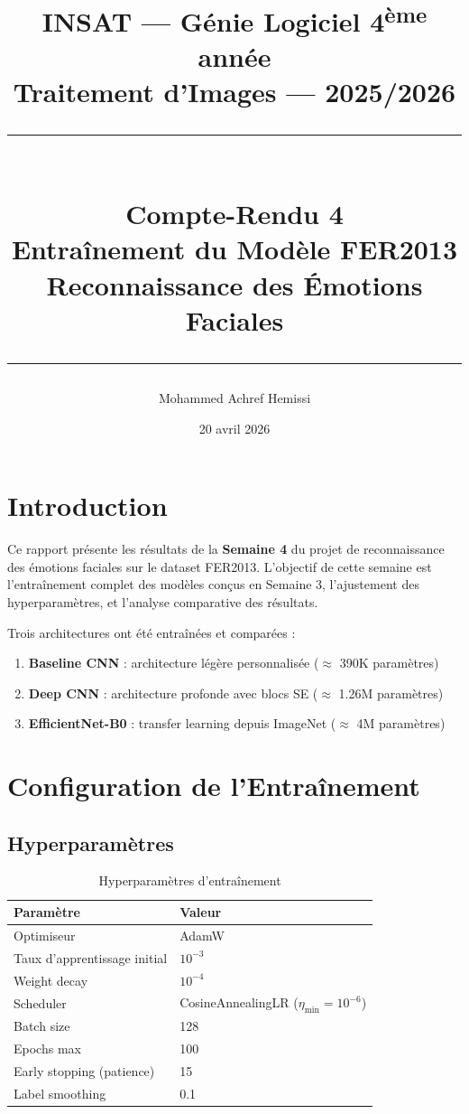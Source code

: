 \documentclass[12pt,a4paper]{article}
\title{
    \vspace{-1cm}
    {\large \textbf{INSAT --- Génie Logiciel 4\textsuperscript{ème} année}}\\[0.3cm]
    {\large Traitement d'Images --- 2025/2026}\\[0.5cm]
    \rule{\linewidth}{0.5pt}\\[0.4cm]
    {\LARGE \textbf{Compte-Rendu 4}}\\[0.2cm]
    {\Large Entraînement du Modèle FER2013}\\[0.2cm]
    {\large Reconnaissance des Émotions Faciales}\\[0.3cm]
    \rule{\linewidth}{0.5pt}
}
\author{Mohammed Achref Hemissi}
\date{20 avril 2026}
\begin{document}
\maketitle
\thispagestyle{empty}
\tableofcontents
\newpage

\section{Introduction}

Ce rapport présente les résultats de la \textbf{Semaine 4} du projet de reconnaissance des émotions faciales sur le dataset FER2013. L'objectif de cette semaine est l'entraînement complet des modèles conçus en Semaine 3, l'ajustement des hyperparamètres, et l'analyse comparative des résultats.

Trois architectures ont été entraînées et comparées :
\begin{enumerate}
    \item \textbf{Baseline CNN} : architecture légère personnalisée ($\approx$ 390K paramètres)
    \item \textbf{Deep CNN} : architecture profonde avec blocs SE ($\approx$ 1.26M paramètres)
    \item \textbf{EfficientNet-B0} : transfer learning depuis ImageNet ($\approx$ 4M paramètres)
\end{enumerate}

\section{Configuration de l'Entraînement}

\subsection{Hyperparamètres}

\begin{table}[H]
\centering
\caption{Hyperparamètres d'entraînement}
\begin{tabular}{ll}
\toprule
\textbf{Paramètre} & \textbf{Valeur} \\
\midrule
Optimiseur          & AdamW \\
Taux d'apprentissage initial & $10^{-3}$ \\
Weight decay        & $10^{-4}$ \\
Scheduler           & CosineAnnealingLR ($\eta_\text{min} = 10^{-6}$) \\
Batch size          & 128 \\
Epochs max          & 100 \\
Early stopping (patience) & 15 \\
Label smoothing     & 0.1 \\
\bottomrule
\end{tabular}
\end{table}
\end{document}
